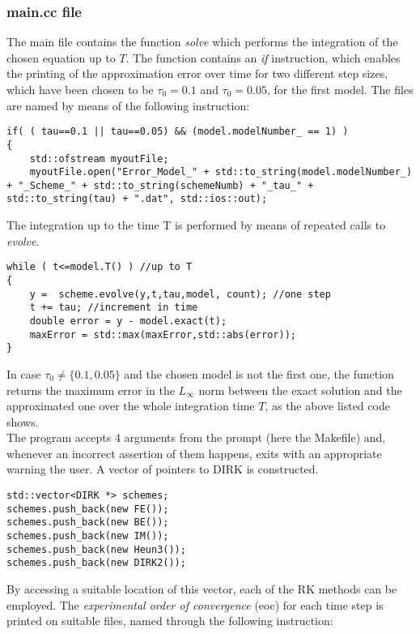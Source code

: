 \documentclass[11pt]{article}
\theoremstyle{theorem}
\theoremstyle{definition}
\begin{document}
\subsubsection{main.cc file}
The main file contains the function \emph{solve} which performs the integration of the chosen equation up to $T$. The function contains an \emph{if} instruction, which enables the printing of the approximation error over time for two different step sizes, which have been chosen to be $\tau_0=0.1$ and $\tau_0=0.05$, for the first model. The files are named by means of the following instruction:

\begin{lstlisting}
if( ( tau==0.1 || tau==0.05) && (model.modelNumber_ == 1) )
{
	std::ofstream myoutFile;
	myoutFile.open("Error_Model_" + std::to_string(model.modelNumber_) + "_Scheme_" + std::to_string(schemeNumb) + "_tau_" + std::to_string(tau) + ".dat", std::ios::out);
\end{lstlisting}

The integration up to the time T is performed by means of repeated calls to \emph{evolve}.

\begin{lstlisting}
while ( t<=model.T() ) //up to T
{
	y =  scheme.evolve(y,t,tau,model, count); //one step
	t += tau; //increment in time
	double error = y - model.exact(t); 
	maxError = std::max(maxError,std::abs(error));
}
\end{lstlisting}

In case $\tau_0\neq\lbrace 0.1, 0.05\rbrace$ and the chosen model is not the first one,  the function returns the maximum error in the $L_\infty$ norm between the exact solution and the approximated one over the whole integration time $T$, as the above listed code shows.\\

The program accepts 4 arguments from the prompt (here the Makefile) and, whenever an incorrect assertion of them happens, exits with an appropriate warning the user. A vector of pointers to DIRK is constructed.\\

\begin{lstlisting}
std::vector<DIRK *> schemes;
schemes.push_back(new FE());
schemes.push_back(new BE());
schemes.push_back(new IM());
schemes.push_back(new Heun3());
schemes.push_back(new DIRK2());
\end{lstlisting}

By accessing a suitable location of this vector, each of the RK methods can be employed. The \emph{experimental order of convergence} (eoc) for each time step is printed on suitable files, named through the following instruction:
\end{document}
